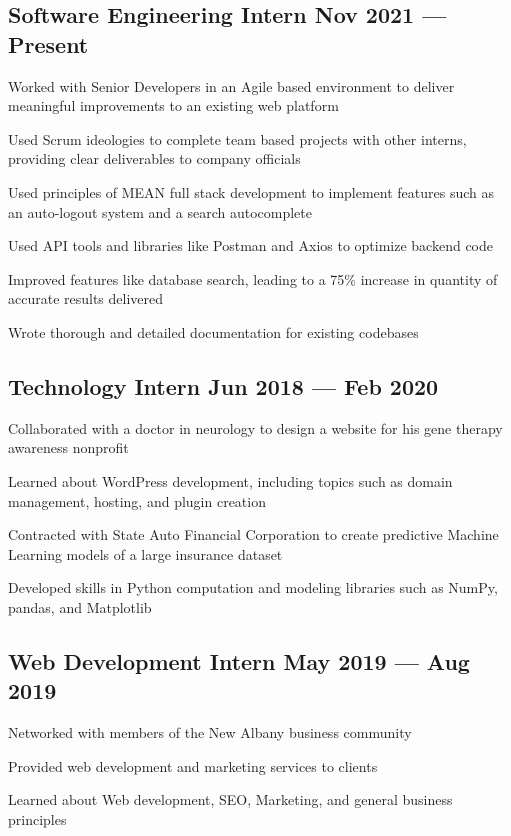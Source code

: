 \documentclass[letter,10pt]{article}
\begin{document}
\subsection{{Software Engineering Intern \hfill Nov 2021 --- Present}}
\begin{zitemize}
\item Worked with Senior Developers in an Agile based environment to deliver meaningful improvements to an existing web platform
\item Used Scrum ideologies to complete team based projects with other interns, providing clear deliverables to company officials
\item Used principles of MEAN full stack development to implement features such as an auto-logout system and a search autocomplete 
\item Used API tools and libraries like Postman and Axios to optimize backend code
\item Improved features like database search, leading to a 75\% increase in quantity of accurate results delivered
\item Wrote thorough and detailed documentation for existing codebases
\end{zitemize}

\subsection{{Technology Intern \hfill Jun 2018 --- Feb 2020}}
\begin{zitemize}
\item Collaborated with a doctor in neurology to design a website for his gene therapy awareness nonprofit
\item Learned about WordPress development, including topics such as domain management, hosting, and plugin creation
\item Contracted with State Auto Financial Corporation to create predictive Machine Learning models of a large insurance dataset
\item Developed skills in Python computation and modeling libraries such as NumPy, pandas, and Matplotlib
\end{zitemize}

\subsection{{Web Development Intern \hfill May 2019 --- Aug 2019}}
\begin{zitemize}
\item Networked with members of the New Albany business community 
\item Provided web development and marketing services to clients
\item Learned about Web development, SEO, Marketing, and general business principles
\end{zitemize}
\end{document}
